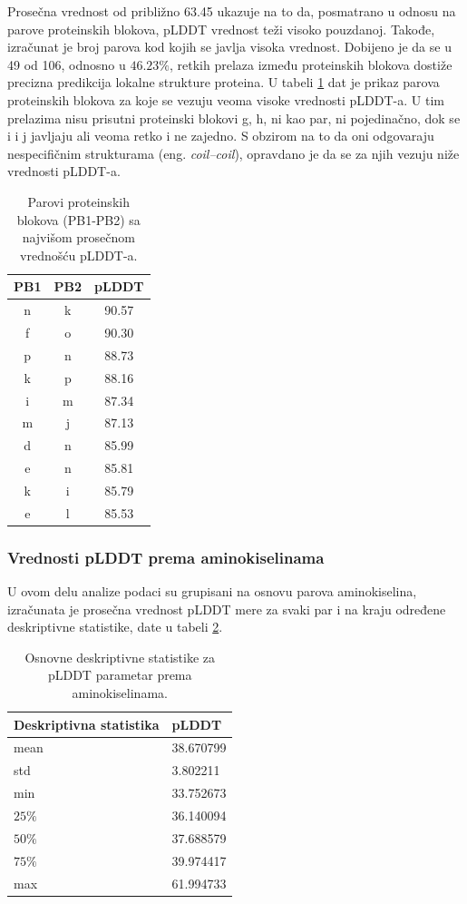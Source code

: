 \documentclass[a4paper,12pt]{article}
\begin{document}
Prosečna vrednost od približno 63.45 ukazuje na to da, posmatrano u odnosu na parove proteinskih blokova, pLDDT vrednost teži visoko pouzdanoj. Takođe, izračunat je broj parova kod kojih se javlja visoka vrednost. Dobijeno je da se u 49 od 106, odnosno u $46.23\%$, retkih prelaza između proteinskih blokova dostiže precizna predikcija lokalne strukture proteina. U tabeli \ref{Tabela:6} dat je prikaz parova proteinskih blokova za koje se vezuju veoma visoke vrednosti pLDDT-a. U tim prelazima nisu prisutni proteinski blokovi g, h, ni kao par, ni pojedinačno, dok se i i j javljaju ali veoma retko i ne zajedno. S obzirom na to da oni odgovaraju nespecifičnim strukturama (eng. \textit{coil–coil}), opravdano je da se za njih vezuju niže vrednosti pLDDT-a.
\begin{table}[h!]
\centering
\begin{tabular}{|c|c|c|}
\hline
\textbf{PB1} & \textbf{PB2} & \textbf{pLDDT} \\
\hline
n & k & 90.57 \\
\hline
f & o & 90.30 \\
\hline
p & n & 88.73 \\
\hline
k & p & 88.16 \\
\hline
i & m & 87.34 \\
\hline
m & j & 87.13 \\
\hline
d & n & 85.99 \\
\hline
e & n & 85.81 \\
\hline
k & i & 85.79 \\
\hline
e & l & 85.53 \\
\hline
\end{tabular}
\caption{Parovi proteinskih blokova (PB1-PB2) sa najvišom prosečnom vrednošću pLDDT-a.}
\label{Tabela:6}
\end{table}
\subsubsection{Vrednosti pLDDT prema aminokiselinama}
U ovom delu analize podaci su grupisani na osnovu parova aminokiselina, izračunata je prosečna vrednost pLDDT mere za svaki par i na kraju određene deskriptivne statistike, date u tabeli \ref{Tabela:7}.
\begin{table}[h!]
    \centering
    \begin{tabular}{ |l|l| } 
    \hline
    \textbf{Deskriptivna statistika} & \textbf{pLDDT} \\
    \hline
    mean & 38.670799 \\
    std  & 3.802211 \\
    min  & 33.752673 \\
    $25\%$  & 36.140094 \\
    $50\%$  & 37.688579 	\\
    $75\%$ & 39.974417\\
    max & 61.994733 	\\
    \hline
    \end{tabular}
    \caption{Osnovne deskriptivne statistike za pLDDT parametar prema aminokiselinama.}
    \label{Tabela:7}
\end{table}
\end{document}
